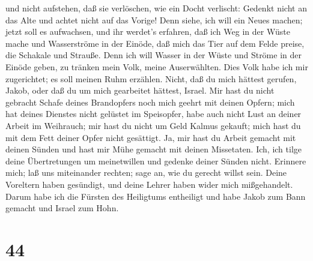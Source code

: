 und nicht aufstehen, daß sie verlöschen, wie ein Docht verlischt:
 Gedenkt nicht an das Alte und achtet nicht auf das Vorige!
 Denn siehe, ich will ein Neues machen; jetzt soll es
aufwachsen, und ihr werdet's erfahren, daß ich Weg in der Wüste mache
und Wasserströme in der Einöde,  daß mich das Tier auf dem
Felde preise, die Schakale und Strauße. Denn ich will Wasser in der
Wüste und Ströme in der Einöde geben, zu tränken mein Volk, meine
Auserwählten.  Dies Volk habe ich mir zugerichtet; es soll
meinen Ruhm erzählen.  Nicht, daß du mich hättest gerufen,
Jakob, oder daß du um mich gearbeitet hättest, Israel.  Mir
hast du nicht gebracht Schafe deines Brandopfers noch mich geehrt mit
deinen Opfern; mich hat deines Dienstes nicht gelüstet im Speisopfer,
habe auch nicht Lust an deiner Arbeit im Weihrauch;  mir
hast du nicht um Geld Kalmus gekauft; mich hast du mit dem Fett deiner
Opfer nicht gesättigt. Ja, mir hast du Arbeit gemacht mit deinen Sünden
und hast mir Mühe gemacht mit deinen Missetaten.  Ich, ich
tilge deine Übertretungen um meinetwillen und gedenke deiner Sünden
nicht.  Erinnere mich; laß uns miteinander rechten; sage
an, wie du gerecht willst sein.  Deine Voreltern haben
gesündigt, und deine Lehrer haben wider mich mißgehandelt. 
Darum habe ich die Fürsten des Heiligtums entheiligt und habe Jakob zum
Bann gemacht und Israel zum Hohn.

\hypertarget{section-43}{%
\section{44}\label{section-43}}

